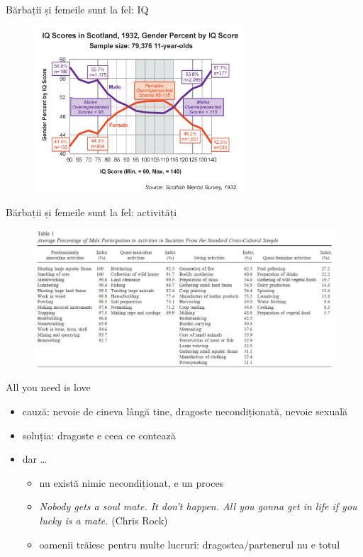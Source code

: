 \documentclass{beamer}
\begin{document}
\begin{frame}{Bărbații și femeile sunt la fel: IQ}
  \centering
  \begin{figure}
    \includegraphics[width=0.7\textwidth]{img/male-female-iq}
  \end{figure}
\end{frame}

\begin{frame}{Bărbații și femeile sunt la fel: activități}
  \centering
  \begin{figure}
    \includegraphics[width=\textwidth]{img/male-activities}
  \end{figure}
\end{frame}

\begin{frame}{All you need is love}
  \begin{itemize}
    \pause \item cauză: nevoie de cineva lângă tine, dragoste necondiționată, nevoie sexuală
    \pause \item soluția: dragoste e ceea ce contează
    \pause \item dar \ldots
      \begin{itemize}
        \pause \item nu există nimic necondiționat, e un proces
        \pause \item \textit{Nobody gets a soul mate. It don't happen. All you gonna get in life if you lucky is a mate.} (Chris Rock)
        \pause \item oamenii trăiesc pentru multe lucruri: dragostea/partenerul nu e totul
      \end{itemize}
  \end{itemize}
\end{frame}
\end{document}
